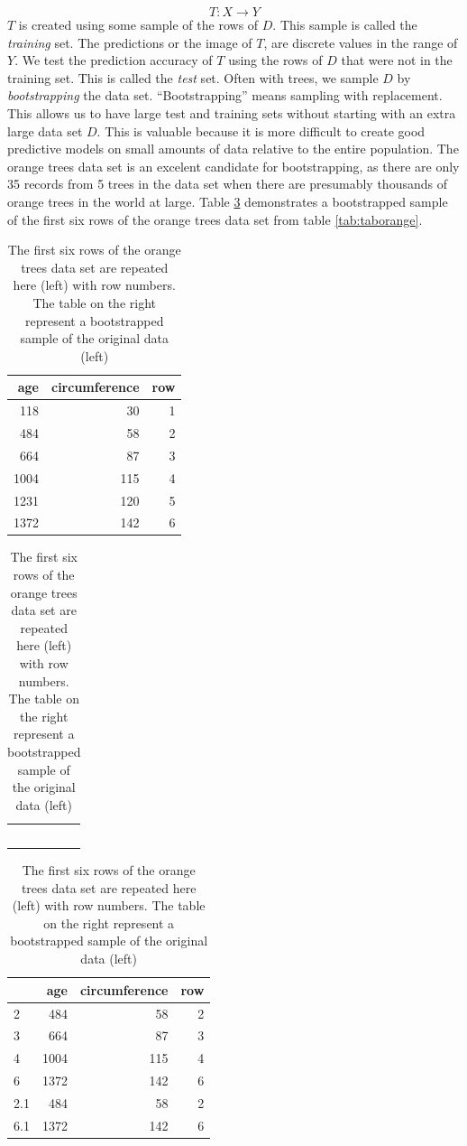 \documentclass[12pt,twoside]{reedthesis}
\begin{document}
  \[T: X \rightarrow Y\] \(T\) is created using some sample of the rows of
  \(D\). This sample is called the \emph{training} set. The predictions or
  the image of \(T\), are discrete values in the range of \(Y\). We test
  the prediction accuracy of \(T\) using the rows of \(D\) that were not
  in the training set. This is called the \emph{test} set. Often with
  trees, we sample \(D\) by \emph{bootstrapping} the data set.
  ``Bootstrapping'' means sampling with replacement. This allows us to
  have large test and training sets without starting with an extra large
  data set \(D\). This is valuable because it is more difficult to create
  good predictive models on small amounts of data relative to the entire
  population. The orange trees data set is an excelent candidate for
  bootstrapping, as there are only 35 records from 5 trees in the data set
  when there are presumably thousands of orange trees in the world at
  large. Table \ref{tab:tabbootorange} demonstrates a bootstrapped sample
  of the first six rows of the orange trees data set from table
  \ref{tab:taborange}.
  
  \begin{table}
  \caption{\label{tab:unnamed-chunk-9}\label{tab:tabbootorange}The first six rows of the orange trees data set are repeated here (left) with row numbers. The table on the right represent a bootstrapped sample of the original data (left)}
  
  \centering
  \begin{tabular}[t]{r|r|r}
  \hline
  age & circumference & row\\
  \hline
  118 & 30 & 1\\
  \hline
  484 & 58 & 2\\
  \hline
  664 & 87 & 3\\
  \hline
  1004 & 115 & 4\\
  \hline
  1231 & 120 & 5\\
  \hline
  1372 & 142 & 6\\
  \hline
  \end{tabular}
  \centering
  \begin{tabular}[t]{l}
  \hline
  \\
  \hline
  \\
  \hline
  \\
  \hline
  \\
  \hline
  \\
  \hline
  \\
  \hline
  \end{tabular}
  \centering
  \begin{tabular}[t]{l|r|r|r}
  \hline
    & age & circumference & row\\
  \hline
  2 & 484 & 58 & 2\\
  \hline
  3 & 664 & 87 & 3\\
  \hline
  4 & 1004 & 115 & 4\\
  \hline
  6 & 1372 & 142 & 6\\
  \hline
  2.1 & 484 & 58 & 2\\
  \hline
  6.1 & 1372 & 142 & 6\\
  \hline
  \end{tabular}
  \end{table}
  
\end{document}
